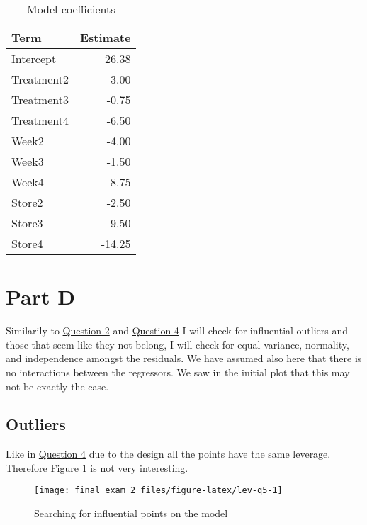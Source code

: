 \documentclass[]{book}
\begin{document}
\begin{table}

\caption{\label{tab:param-est-q5}Model coefficients}
\centering
\begin{tabular}[t]{lr}
\toprule
Term & Estimate\\
\midrule
Intercept & 26.38\\
Treatment2 & -3.00\\
Treatment3 & -0.75\\
Treatment4 & -6.50\\
Week2 & -4.00\\
\addlinespace
Week3 & -1.50\\
Week4 & -8.75\\
Store2 & -2.50\\
Store3 & -9.50\\
Store4 & -14.25\\
\bottomrule
\end{tabular}
\end{table}

\hypertarget{part-d-4}{%
\section{Part D}\label{part-d-4}}

Similarily to \protect\hyperlink{question-2}{Question 2} and \protect\hyperlink{question-4}{Question 4} I will check for influential outliers and those that seem like they not belong, I will check for equal variance, normality, and independence amongst the residuals. We have assumed also here that there is no interactions between the regressors. We saw in the initial plot that this may not be exactly the case.

\hypertarget{outliers-2}{%
\subsection{Outliers}\label{outliers-2}}

Like in \protect\hyperlink{question-4}{Question 4} due to the design all the points have the same leverage. Therefore Figure \ref{fig:lev-q5} is not very interesting.

\begin{figure}

{\centering \texttt{[image: final\_exam\_2\_files/figure-latex/lev-q5-1]} 

}

\caption{Searching for influential points on the model}\label{fig:lev-q5}
\end{figure}
\end{document}
